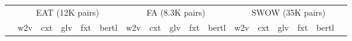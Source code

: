 \documentclass[letterpaper]{article} %
\begin{document}
\begin{table}[ht]
\centering

\begin{tabular}{@{}l|ccccc|ccccc|cccccc@{}}



  & \multicolumn{5}{c}{EAT (12K pairs)} & \multicolumn{5}{c}{FA (8.3K pairs)}  & \multicolumn{6}{c}{SWOW (35K pairs) }\\


  & w2v & cxt &glv & fxt & bertl & w2v & cxt &glv & fxt & bertl & w2v & cxt &glv & fxt & bertl\\

 \hline


\end{tabular}
\end{table}
\end{document}
